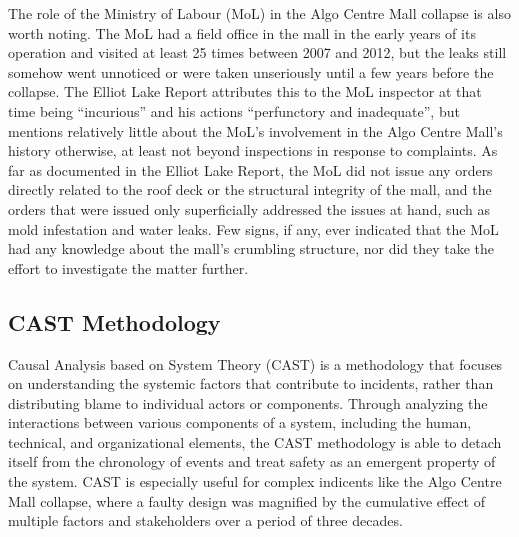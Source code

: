 \documentclass[12pt]{article}
\begin{document}
The role of the Ministry of Labour (MoL) in the Algo Centre Mall collapse is also worth noting. The MoL had a field office in the mall in the early years of its operation and visited at least 25 times between 2007 and 2012, but the leaks still somehow went unnoticed or were taken unseriously until a few years before the collapse. The Elliot Lake Report attributes this to the MoL inspector at that time being ``incurious'' and his actions ``perfunctory and inadequate'', but mentions relatively little about the MoL's involvement in the Algo Centre Mall's history otherwise, at least not beyond inspections in response to complaints. As far as documented in the Elliot Lake Report, the MoL did not issue any orders directly related to the roof deck or the structural integrity of the mall, and the orders that were issued only superficially addressed the issues at hand, such as mold infestation and water leaks. Few signs, if any, ever indicated that the MoL had any knowledge about the mall's crumbling structure, nor did they take the effort to investigate the matter further. 

\subsection{CAST Methodology}

Causal Analysis based on System Theory (CAST) is a methodology that focuses on understanding the systemic factors that contribute to incidents, rather than distributing blame to individual actors or components. Through analyzing the interactions between various components of a system, including the human, technical, and organizational elements, the CAST methodology is able to detach itself from the chronology of events and treat safety as an emergent property of the system. CAST is especially useful for complex indicents like the Algo Centre Mall collapse, where a faulty design was magnified by the cumulative effect of multiple factors and stakeholders over a period of three decades. 
\end{document}
